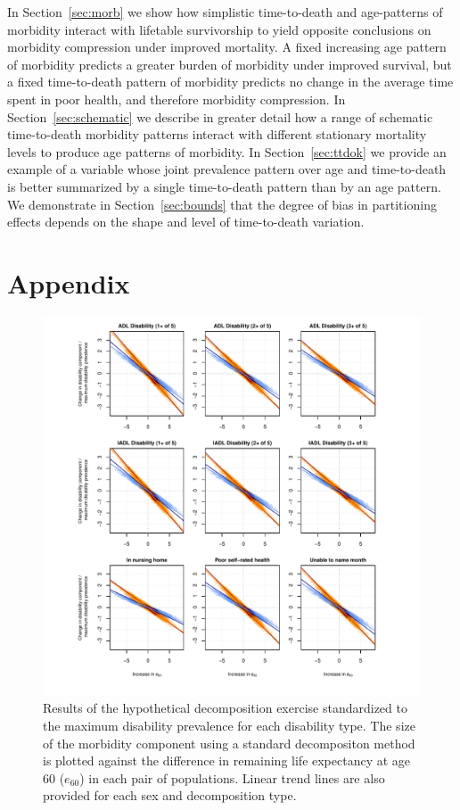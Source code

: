 \documentclass[11pt,oneside,a4paper]{article} %
\begin{document}
In Section~\ref{sec:morb} we show how simplistic time-to-death and age-patterns of morbidity interact with lifetable survivorship to yield opposite conclusions on morbidity compression under improved mortality. A fixed increasing age pattern of morbidity predicts a greater burden of morbidity under improved survival, but a fixed time-to-death pattern of morbidity predicts no change in the average time spent in poor health, and therefore morbidity compression. In Section~\ref{sec:schematic} we describe in greater detail how a range of schematic time-to-death morbidity patterns interact with different stationary mortality levels to produce age patterns of morbidity. In Section~\ref{sec:ttdok} we provide an example of a variable whose joint prevalence pattern over age and time-to-death is better summarized by a single time-to-death pattern than by an age pattern. We demonstrate in Section~\ref{sec:bounds} that the degree of bias in partitioning effects depends on the shape and level of time-to-death variation. 

\section{Appendix}

\begin{figure}
\begin{adjustwidth}{-1.5cm}{}
	\centering
	\includegraphics[scale=.8]{Figures/Decomp_3x3_rel.pdf}
	\caption{Results of the hypothetical decomposition exercise standardized to the maximum disability prevalence for each disability type. The size of the
	morbidity component using a standard decompositon method is plotted against
	the difference in remaining life expectancy at age 60 ($e_{60}$) in each
	pair of populations. Linear trend lines are also provided for each sex and decomposition type.}
	\label{fig:Fig_Decomp_3x3_rel}
\end{adjustwidth}
\end{figure}

\newpage%


\end{document}
